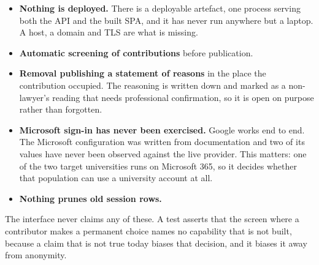 \documentclass[11pt,a4paper]{article}
\begin{document}
\begin{itemize}[leftmargin=*]
  \item \textbf{Nothing is deployed.} There is a deployable artefact, one
        process serving both the API and the built SPA, and it has never run
        anywhere but a laptop. A host, a domain and TLS are what is missing.
  \item \textbf{Automatic screening of contributions} before publication.
  \item \textbf{Removal publishing a statement of reasons} in the place the
        contribution occupied. The reasoning is written down and marked as a
        non-lawyer's reading that needs professional confirmation, so it is
        open on purpose rather than forgotten.
  \item \textbf{Microsoft sign-in has never been exercised.} Google works end
        to end. The Microsoft configuration was written from documentation and
        two of its values have never been observed against the live provider.
        This matters: one of the two target universities runs on Microsoft 365,
        so it decides whether that population can use a university account at
        all.
  \item \textbf{Nothing prunes old session rows.}
\end{itemize}

\begin{why}
The interface never claims any of these. A test asserts that the screen where a
contributor makes a permanent choice names no capability that is not built,
because a claim that is not true today biases that decision, and it biases it
away from anonymity.
\end{why}

\vfill
{}
\end{document}
